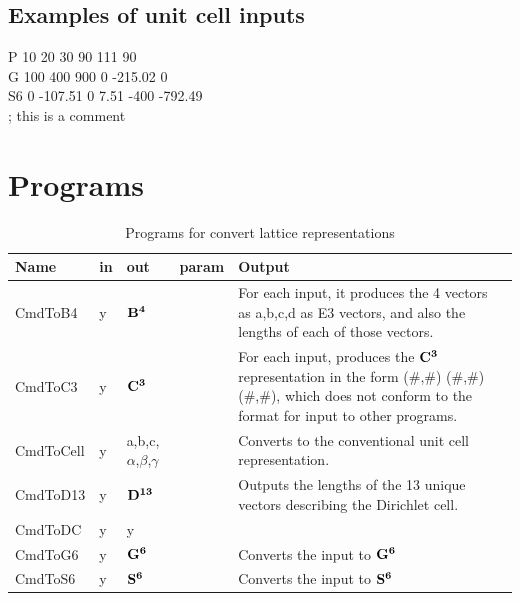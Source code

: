 \documentclass[preprint]{iucr}              %
\numberwithin{equation}{section}
\newcommand{\BIV}[0]{$\bf{B^{4}}$}
\newcommand{\SVI}[0]{$\bf{S^{6}}$}
\newcommand{\GVI}[0]{$\bf{G^{6}}$}
\newcommand{\CIII}[0]{$\bf{C^{3}}$}
\newcommand{\DXIII}[0]{$\bf{D^{13}}$}
\begin{document}
	\subsection{Examples of unit cell inputs}
	\noindent
	P 10 20 30 90 111 90\\
	G 100 400 900  0 -215.02 0\\
	S6   0 -107.51  0   7.51 -400 -792.49\\
	; this is a comment
	
	\section{Programs}
	
	
	\begin{table}
		\caption{Programs for convert lattice representations}
		\begin{tabular}{l l l p{} p{} l}
			\toprule
			Name&	in&	out&	param& Output	\\
			\midrule
			CmdToB4&	y&	\BIV{}&&		For each input, 
			it produces the 4 vectors as a,b,c,d as E3 vectors, 
			and also the lengths of each of those vectors.\\[.9pt]
			CmdToC3&	y&	\CIII{}&&		
			For each input, produces the \CIII{} representation in the form 
			(\#,\#) (\#,\#) (\#,\#), 
			which does not conform to the format for input to other programs.\\[.9pt]
			CmdToCell&	y&	a,b,c,$\alpha$,$\beta$,$\gamma$&&		
			Converts to the conventional unit cell representation.\\[.9pt]
			CmdToD13&	y&	\DXIII{}&&		
			Outputs the lengths of the 13 unique vectors describing the Dirichlet cell.\\[.9pt]
			CmdToDC&	y&	y		\\[.9pt]
			CmdToG6&	y&	\GVI{}&&		Converts the input to \GVI{}\\[.9pt]
			CmdToS6&	y&	\SVI{}&&		Converts the input to \SVI{}\\[.9pt]
			\bottomrule
			
		\end{tabular}
	\end{table}
\end{document}
